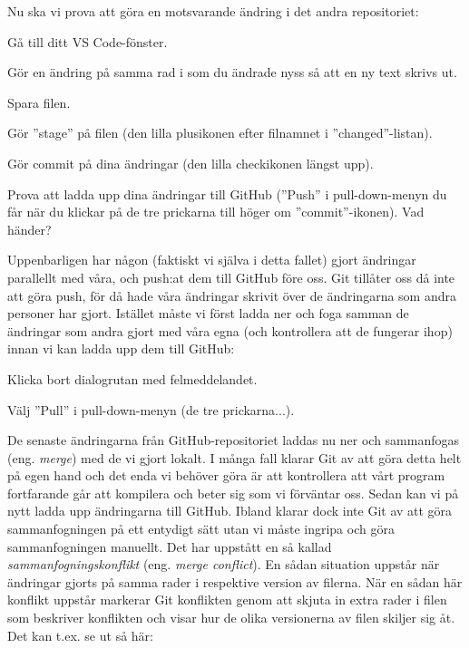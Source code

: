 \begin{Datorarbete}
Nu ska vi prova att göra en motsvarande ändring i det andra repositoriet:
\begin{Deluppgifter}
\item Gå till ditt VS Code-fönster.
\item Gör en ändring på samma rad i  som du ändrade nyss så att en ny text skrivs ut.
\item Spara filen.
\item Gör ''stage'' på filen (den lilla plusikonen efter filnamnet i ''changed''-listan).
\item Gör commit på dina ändringar (den lilla checkikonen längst upp).
\item Prova att ladda upp dina ändringar till GitHub (''Push'' i pull-down-menyn du får när du klickar på de tre prickarna till höger om ''commit''-ikonen). Vad händer?
\end{Deluppgifter}

Uppenbarligen har någon (faktiskt vi själva i detta fallet) gjort ändringar parallellt med våra, och push:at dem till GitHub före oss. Git tillåter oss då inte att göra push, för då hade våra ändringar skrivit över de ändringarna som andra personer har gjort.	Istället måste vi först ladda ner och foga samman de ändringar som andra gjort med våra egna (och kontrollera att de fungerar ihop) innan vi kan ladda upp dem till GitHub:

\begin{Deluppgifter}
\item Klicka bort dialogrutan med felmeddelandet.
\item Välj ''Pull'' i pull-down-menyn (de tre prickarna...).
\end{Deluppgifter}

De senaste ändringarna från GitHub-repositoriet laddas nu ner och sammanfogas (eng. \emph{merge}) med de vi gjort lokalt. I många fall klarar Git av att göra detta helt på egen hand och det enda vi behöver göra är att kontrollera att vårt program fortfarande går att kompilera och beter sig som vi förväntar oss. Sedan kan vi på nytt ladda upp ändringarna till GitHub. Ibland  klarar dock inte Git av att göra sammanfogningen på ett entydigt sätt utan vi måste ingripa och göra sammanfogningen manuellt. Det har uppstått en så kallad \emph{sammanfogningskonflikt} (eng. \emph{merge conflict}). En sådan situation uppstår när ändringar gjorts på samma rader i respektive version av filerna. När en sådan här konflikt uppstår markerar Git konflikten genom att skjuta in extra rader i filen som beskriver konflikten och visar hur de olika versionerna av filen skiljer sig åt. Det kan t.ex. se ut så här:


\end{Datorarbete}
